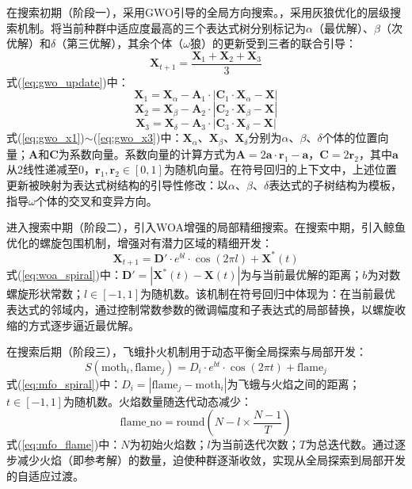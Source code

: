 \documentclass[a4paper,12pt]{ctexart}
\begin{document}
在搜索初期（阶段一），采用GWO引导的全局方向搜索。，采用灰狼优化的层级搜索机制。将当前种群中适应度最高的三个表达式树分别标记为$\alpha$（最优解）、$\beta$（次优解）和$\delta$（第三优解），其余个体（$\omega$狼）的更新受到三者的联合引导：
\begin{equation}
  \mathbf{X}_{t+1} = \frac{\mathbf{X}_1 + \mathbf{X}_2 + \mathbf{X}_3}{3} \tag{2}
  \label{eq:gwo_update}
\end{equation}
式(\ref{eq:gwo_update})中：
\begin{equation}
  \mathbf{X}_1 = \mathbf{X}_\alpha - \mathbf{A}_1 \cdot |\mathbf{C}_1 \cdot \mathbf{X}_\alpha - \mathbf{X}| \tag{3}
  \label{eq:gwo_x1}
\end{equation}
\begin{equation}
  \mathbf{X}_2 = \mathbf{X}_\beta - \mathbf{A}_2 \cdot |\mathbf{C}_2 \cdot \mathbf{X}_\beta - \mathbf{X}| \tag{4}
  \label{eq:gwo_x2}
\end{equation}
\begin{equation}
  \mathbf{X}_3 = \mathbf{X}_\delta - \mathbf{A}_3 \cdot |\mathbf{C}_3 \cdot \mathbf{X}_\delta - \mathbf{X}| \tag{5}
  \label{eq:gwo_x3}
\end{equation}
式(\ref{eq:gwo_x1})$\sim$(\ref{eq:gwo_x3})中：$\mathbf{X}_\alpha$、$\mathbf{X}_\beta$、$\mathbf{X}_\delta$分别为$\alpha$、$\beta$、$\delta$个体的位置向量；$\mathbf{A}$和$\mathbf{C}$为系数向量。系数向量的计算方式为$\mathbf{A} = 2\mathbf{a} \cdot \mathbf{r}_1 - \mathbf{a}$，$\mathbf{C} = 2\mathbf{r}_2$，其中$\mathbf{a}$从2线性递减至0，$\mathbf{r}_1, \mathbf{r}_2 \in [0,1]$为随机向量。在符号回归的上下文中，上述位置更新被映射为表达式树结构的引导性修改：以$\alpha$、$\beta$、$\delta$表达式的子树结构为模板，指导$\omega$个体的交叉和变异方向。

进入搜索中期（阶段二），引入WOA增强的局部精细搜索。在搜索中期，引入鲸鱼优化的螺旋包围机制，增强对有潜力区域的精细开发：
\begin{equation}
  \mathbf{X}_{t+1} = \mathbf{D}' \cdot e^{bl} \cdot \cos(2\pi l) + \mathbf{X}^*(t) \tag{6}
  \label{eq:woa_spiral}
\end{equation}
式(\ref{eq:woa_spiral})中：$\mathbf{D}' = |\mathbf{X}^*(t) - \mathbf{X}(t)|$为与当前最优解的距离；$b$为对数螺旋形状常数；$l \in [-1, 1]$为随机数。该机制在符号回归中体现为：在当前最优表达式的邻域内，通过控制常数参数的微调幅度和子表达式的局部替换，以螺旋收缩的方式逐步逼近最优解。

在搜索后期（阶段三），飞蛾扑火机制用于动态平衡全局探索与局部开发：
\begin{equation}
  S(\text{moth}_i, \text{flame}_j) = D_i \cdot e^{bt} \cdot \cos(2\pi t) + \text{flame}_j \tag{7}
  \label{eq:mfo_spiral}
\end{equation}
式(\ref{eq:mfo_spiral})中：$D_i = |\text{flame}_j - \text{moth}_i|$为飞蛾与火焰之间的距离；$t \in [-1, 1]$为随机数。火焰数量随迭代动态减少：
\begin{equation}
  \text{flame\_no} = \text{round}\left(N - l \times \frac{N-1}{T}\right) \tag{8}
  \label{eq:mfo_flame}
\end{equation}
式(\ref{eq:mfo_flame})中：$N$为初始火焰数；$l$为当前迭代次数；$T$为总迭代数。通过逐步减少火焰（即参考解）的数量，迫使种群逐渐收敛，实现从全局探索到局部开发的自适应过渡。
\end{document}
